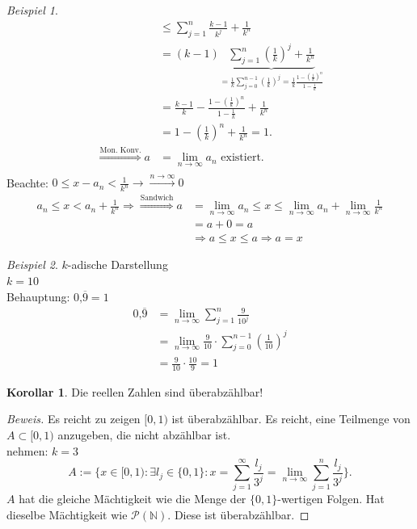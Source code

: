 \documentclass[12pt,a4paper,titlepage]{article} %
\theoremstyle{definition}
\newtheorem{kor}[satz]{Korollar}
\theoremstyle{remark}
\newtheorem*{bsp}{Beispiel}
\newenvironment{bew}{\begin{proof}[Beweis]}{\end{proof}}
\newcommand{\N}{\mathbb{N}}
\newcommand{\limes}[1]{\lim\limits_{#1\rightarrow\infty}}
\begin{document}
\begin{bsp}
\begin{align*}
		&\leq \sum_{j=1}^{n} \frac{k-1}{k^j} + \frac{1}{k^n}\\
		&= (k-1)\underbrace{ \sum_{j=1}^{n} (\frac{1}{k})^j + \frac{1}{k^n} }_{= \frac{1}{k} \sum_{j=0}^{n-1} (\frac{1}{k})^j = \frac{1}{k} \frac{1-(\frac{1}{k})^n}{1-\frac{1}{k}} }\\
		&=\frac{k-1}{k}-\frac{1-(\frac{1}{k})^n}{1-\frac{1}{k}} + \frac{1}{k^n}\\
		&= 1- \left(\frac{1}{k}\right)^n + \frac{1}{k^n} = 1.\\
		\overset{\text{Mon. Konv.}}{\Rightarrow} a &= \limes{n} a_n \text{ existiert.}\\
	\end{align*}
	Beachte: \(0 \leq x-a_n < \frac{1}{k^n} \rightarrow\overset{n \rightarrow \infty}{\rightarrow} 0\)\\	 
	\begin{align*}
		a_n \leq x < a_n + \frac{1}{k^n} \Rightarrow\overset{\text{Sandwich}}{\Rightarrow}
		a &= \limes{n} a_n \leq x \leq \limes{n} a_n + \limes{n} \frac{1}{k^n}\\
		&= a + 0 = a\\
		&\Rightarrow a \leq x \leq a \Rightarrow a = x
	\end{align*}
\end{bsp}
\begin{bsp}
	\(k\)-adische Darstellung\\
	\(k = 10\)\\
	Behauptung: \(0\text{,}\overline{9} = 1\)
	\begin{align*}
		0\text{,}\overline{9} &= \limes{n} \sum_{j=1}^{n} \frac{9}{10^j}\\
		&=\limes{n} \frac{9}{10}\cdot \sum_{j=0}^{n-1}\left(\frac{1}{10}\right)^j\\
		&=\frac{9}{10}\cdot\frac{10}{9} = 1
	\end{align*}
\end{bsp}
\begin{kor}
	Die reellen Zahlen sind überabzählbar!
\end{kor}
\begin{bew}
	Es reicht zu zeigen \( [0,1) \) ist überabzählbar. Es reicht, eine Teilmenge von \(A \subset [0,1) \) anzugeben, die nicht abzählbar ist.\\
	nehmen: \(k=3\)
	\[ A:= \{ x\in[0,1) : \exists l_j \in \{0,1 \}: x = \sum_{j=1}^{\infty} \frac{l_j}{3^j} = \limes{n} \sum_{j=1}^{n}\frac{l_j}{3^j} \}. \]
	\(A\) hat die gleiche Mächtigkeit wie die Menge der \( \{0,1\} \)-wertigen Folgen. Hat dieselbe Mächtigkeit wie \(\mathcal{P}(\N)\). Diese ist überabzählbar.
\end{bew}
\end{document}
